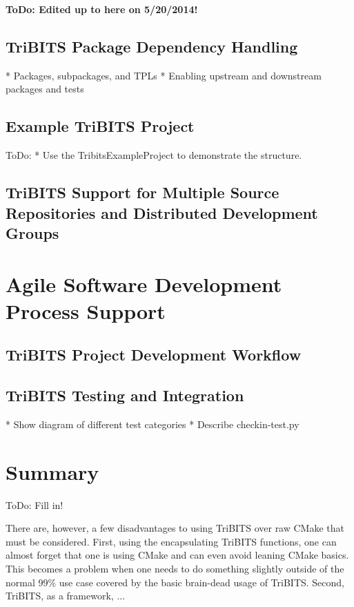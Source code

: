 \documentclass[note]{TechNote}
\begin{document}
\textbf{ToDo: Edited up to here on 5/20/2014!}

%
\subsection{TriBITS Package Dependency Handling}
%

* Packages, subpackages, and TPLs
* Enabling upstream and downstream packages and tests

%
\subsection{Example TriBITS Project}
%

ToDo:
* Use the TribitsExampleProject to demonstrate the structure.


%
\subsection{TriBITS Support for Multiple Source Repositories and Distributed Development Groups}
%


%
\section{Agile Software Development Process Support}
%


%
\subsection{TriBITS Project Development Workflow}
%


%
\subsection{TriBITS Testing and Integration}
%

* Show diagram of different test categories
* Describe checkin-test.py


%
\section{Summary}
%

ToDo: Fill in!

There are, however, a few disadvantages to using TriBITS over raw CMake that must be considered.  First, using the encapsulating TriBITS functions, one can almost forget that one is using CMake and can even avoid leaning CMake basics.  This becomes a problem when one needs to do something slightly outside of the normal 99\% use case covered by the basic brain-dead usage of TriBITS.  Second, TriBITS, as a framework, ...





\closing
\caution
\end{document}
